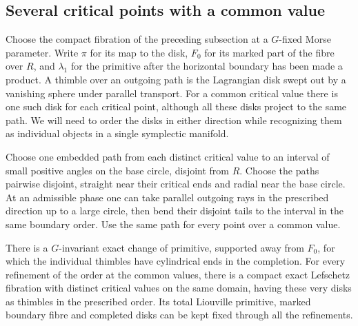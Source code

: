 \subsection{Several critical points with a common value}\label{sec:commondisks}

Choose the compact fibration of the preceding subsection at a $G$-fixed Morse parameter. Write $\pi$ for its map to the disk, $F_0$ for its marked part of the fibre over $R$, and $\lambda_1$ for the primitive after the horizontal boundary has been made a product. A thimble over an outgoing path is the Lagrangian disk swept out by a vanishing sphere under parallel transport. For a common critical value there is one such disk for each critical point, although all these disks project to the same path. We will need to order the disks in either direction while recognizing them as individual objects in a single symplectic manifold.

Choose one embedded path from each distinct critical value to an interval of small positive angles on the base circle, disjoint from $R$. Choose the paths pairwise disjoint, straight near their critical ends and radial near the base circle. At an admissible phase one can take parallel outgoing rays in the prescribed direction up to a large circle, then bend their disjoint tails to the interval in the same boundary order. Use the same path for every point over a common value.

\begin{lemma}\label{lem:samedisks}
There is a $G$-invariant exact change of primitive, supported away from $F_0$, for which the individual thimbles have cylindrical ends in the completion. For every refinement of the order at the common values, there is a compact exact Lefschetz fibration with distinct critical values on the same domain, having these very disks as thimbles in the prescribed order. Its total Liouville primitive, marked boundary fibre and completed disks can be kept fixed through all the refinements.
\end{lemma}

